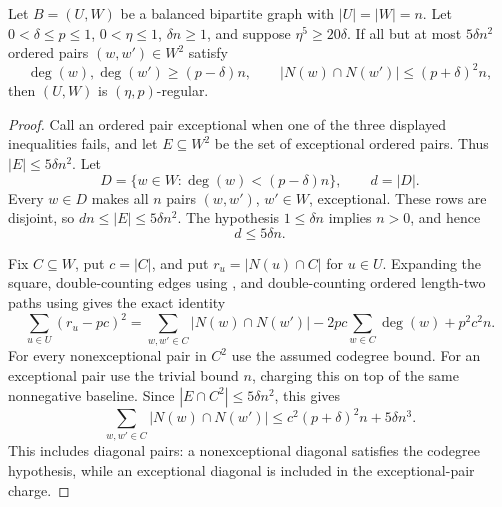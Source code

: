 \begin{lemma}
Let $B=(U,W)$ be a balanced bipartite graph with $|U|=|W|=n$.  Let $0<\delta\le p\le1$, $0<\eta\le1$, $\delta n\ge1$, and suppose $\eta^5\ge20\delta$.  If all but at most $5\delta n^2$ ordered pairs $(w,w')\in W^2$ satisfy
\[
 \deg(w),\deg(w')\ge(p-\delta)n,
 \qquad |N(w)\cap N(w')|\le(p+\delta)^2n,
\]
then $(U,W)$ is $(\eta,p)$-regular.
\end{lemma}
\begin{proof}
Call an ordered pair exceptional when one of the three displayed inequalities fails, and let $E\subseteq W^2$ be the set of exceptional ordered pairs.  Thus $|E|\le5\delta n^2$.  Let
\[
 D=\{w\in W:\deg(w)<(p-\delta)n\},\qquad d=|D|.
\]
Every $w\in D$ makes all $n$ pairs $(w,w')$, $w'\in W$, exceptional.  These rows are disjoint, so $dn\le |E|\le5\delta n^2$.  The hypothesis $1\le\delta n$ implies $n>0$, and hence
\[
 d\le5\delta n.                                                   \tag{1}
\]

Fix $C\subseteq W$, put $c=|C|$, and put $r_u=|N(u)\cap C|$ for $u\in U$.  Expanding the square, double-counting edges using , and double-counting ordered length-two paths using  gives the exact identity
\[
 \sum_{u\in U}(r_u-pc)^2
 =\sum_{w,w'\in C}|N(w)\cap N(w')|-2pc\sum_{w\in C}\deg(w)+p^2c^2n. \tag{2}
\]
For every nonexceptional pair in $C^2$ use the assumed codegree bound.  For an exceptional pair use the trivial bound $n$, charging this on top of the same nonnegative baseline.  Since $|E\cap C^2|\le5\delta n^2$, this gives
\[
 \sum_{w,w'\in C}|N(w)\cap N(w')|
 \le c^2(p+\delta)^2n+5\delta n^3.                                \tag{3}
\]
This includes diagonal pairs: a nonexceptional diagonal satisfies the codegree hypothesis, while an exceptional diagonal is included in the exceptional-pair charge.


\end{proof}
